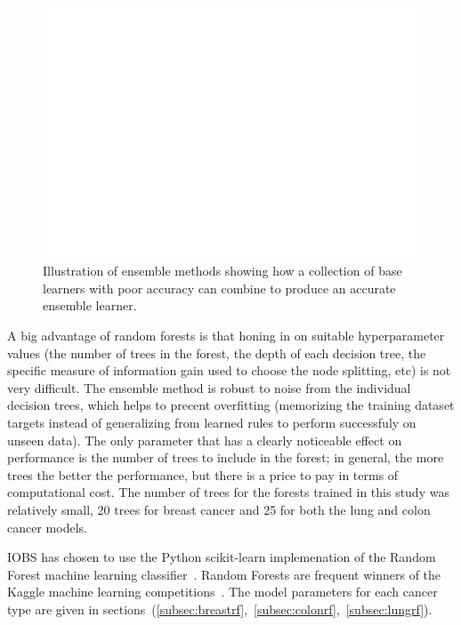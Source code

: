 \documentclass[a4paper,11pt]{article}
\begin{document}
\begin{figure}[!ht]
  \centering
    \includegraphics[scale=.75]{ensemble}
\caption{\label{fig:ensemble} Illustration of ensemble methods showing how a collection of base learners with poor accuracy can combine to produce an accurate ensemble learner.}
\end{figure}



A big advantage of random forests is that honing in on suitable hyperparameter values (the number of trees in the forest, the depth of each decision tree, the specific measure of information gain used to choose the node splitting, etc) is not very difficult. The ensemble method is robust to noise from the individual decision trees, which helps to precent overfitting (memorizing the training dataset targets instead of generalizing from learned rules to perform successfuly on unseen data). The only parameter that has a clearly noticeable effect on performance is the number of trees to include in the forest; in general, the more trees the better the performance, but there is a price to pay in terms of computational cost. The number of trees for the forests trained in this study was relatively small, 20 trees for breast cancer and 25 for both the lung and colon cancer models. 

IOBS has chosen to use the Python scikit-learn implemenation of the Random Forest machine 
learning classifier~\cite{rf}.
Random Forests are frequent winners of the Kaggle machine learning competitions~\cite{kagglerf}.
The model parameters for each cancer type are given in sections~(\ref{subsec:breastrf},~\ref{subsec:colonrf},~\ref{subsec:lungrf}).
\end{document}

